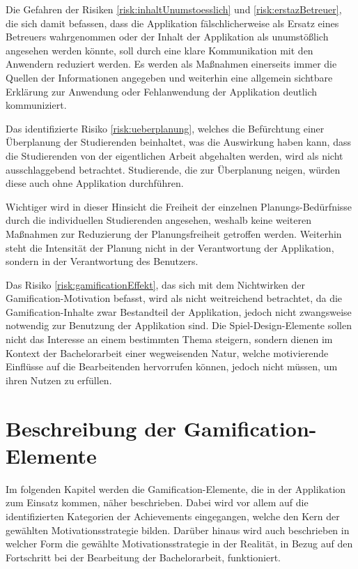 \documentclass[bibliography=totoc,listof=totoc,BCOR=5mm,DIV=12,oneside]{scrbook}
\begin{document}
\par \medskip Die Gefahren der Risiken \ref{risk:inhaltUnumstoesslich} und \ref{risk:erstazBetreuer}, die sich damit befassen, dass die Applikation fälschlicherweise als Ersatz eines Betreuers wahrgenommen oder der Inhalt der Applikation als unumstößlich angesehen werden könnte, soll durch eine klare Kommunikation mit den Anwendern reduziert werden. Es werden als Maßnahmen einerseits immer die Quellen der Informationen angegeben und weiterhin eine allgemein sichtbare Erklärung zur Anwendung oder Fehlanwendung der Applikation deutlich kommuniziert.

\par \medskip  Das identifizierte Risiko \ref{risk:ueberplanung}, welches die Befürchtung einer Überplanung der Studierenden beinhaltet, was die Auswirkung haben kann, dass die Studierenden von der eigentlichen Arbeit abgehalten werden, wird als nicht ausschlaggebend betrachtet.
Studierende, die zur Überplanung neigen, würden diese auch ohne Applikation durchführen. 
\par Wichtiger wird in dieser Hinsicht die Freiheit der einzelnen Planungs-Bedürfnisse durch die individuellen Studierenden angesehen, weshalb keine weiteren Maßnahmen zur Reduzierung der Planungsfreiheit getroffen werden. Weiterhin steht die Intensität der Planung nicht in der Verantwortung der Applikation, sondern in der Verantwortung des Benutzers. 

\par \medskip Das Risiko \ref{risk:gamificationEffekt}, das sich mit dem Nichtwirken der Gamification-Motivation befasst, wird als nicht weitreichend betrachtet, da die Gamification-Inhalte zwar Bestandteil der Applikation, jedoch nicht zwangsweise notwendig zur Benutzung der Applikation sind. Die Spiel-Design-Elemente sollen nicht das Interesse an einem bestimmten Thema steigern, sondern dienen im Kontext der Bachelorarbeit einer wegweisenden Natur, welche motivierende Einflüsse auf die Bearbeitenden hervorrufen können, jedoch nicht müssen, um ihren Nutzen zu erfüllen. 

\newpage
\section{Beschreibung der Gamification-Elemente} \label{sec:gamificationelemente}
\par Im folgenden Kapitel werden die Gamification-Elemente, die in der Applikation zum Einsatz kommen, näher beschrieben. Dabei wird vor allem auf die identifizierten Kategorien der Achievements eingegangen, welche den Kern der gewählten Motivationsstrategie bilden. Darüber hinaus wird auch beschrieben in welcher Form die gewählte Motivationsstrategie in der Realität, in Bezug auf den Fortschritt bei der Bearbeitung der Bachelorarbeit, funktioniert.
\end{document}
